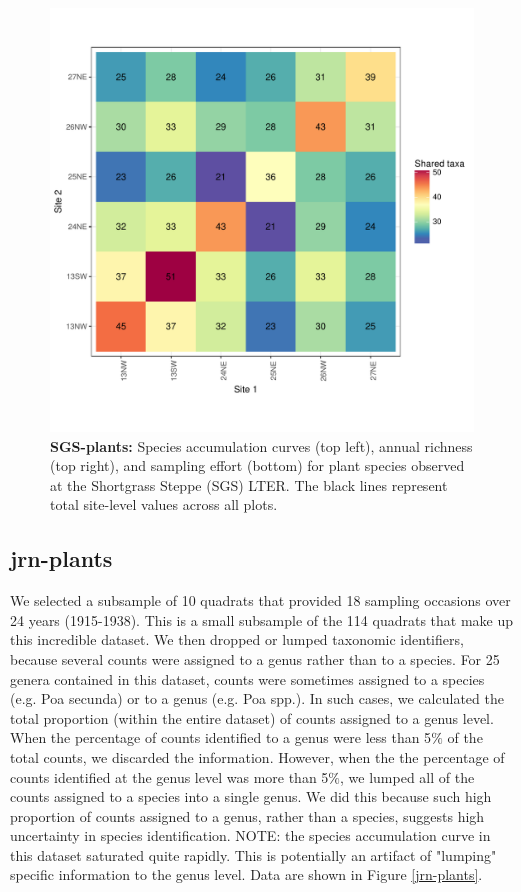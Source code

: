 \documentclass[11pt, oneside]{article}
\begin{document}
\begin{figure}[h!]
\includegraphics[scale = 0.4]{sgs-plants-catano_spp_shared.pdf}
\caption{{\bf SGS-plants:} Species accumulation curves (top left),  annual richness (top right), and sampling effort (bottom)  for plant species observed at the Shortgrass Steppe (SGS) LTER. The black lines represent total site-level values across all plots.}
\label{sgs-plants}
\end{figure}

\subsection{jrn-plants}
We selected a subsample of 10 quadrats that provided 18 sampling occasions over 24 years (1915-1938). 
This is a small subsample of the 114 quadrats that make up this incredible dataset. 
We then dropped or lumped taxonomic identifiers, because several counts were assigned to a genus rather than to a species. 
For 25 genera contained in this dataset, counts were sometimes assigned to a species (e.g. Poa secunda) or to a genus (e.g. Poa spp.). 
In such cases, we calculated the total proportion (within the entire dataset) of counts assigned to a genus level. 
When the percentage of counts identified to a genus were less than 5$\%$ of the total counts, we discarded the information. 
However, when the the percentage of counts identified at the genus level was more than 5$\%$, we lumped all of the counts assigned to a species into a single genus. 
We did this because such high proportion of counts assigned to a genus, rather than a species, suggests high uncertainty in species identification.
NOTE: the species accumulation curve in this dataset saturated quite rapidly. This is potentially an artifact of "lumping" specific information to the genus level. 
Data are shown in Figure \ref{jrn-plants}.
\end{document}
